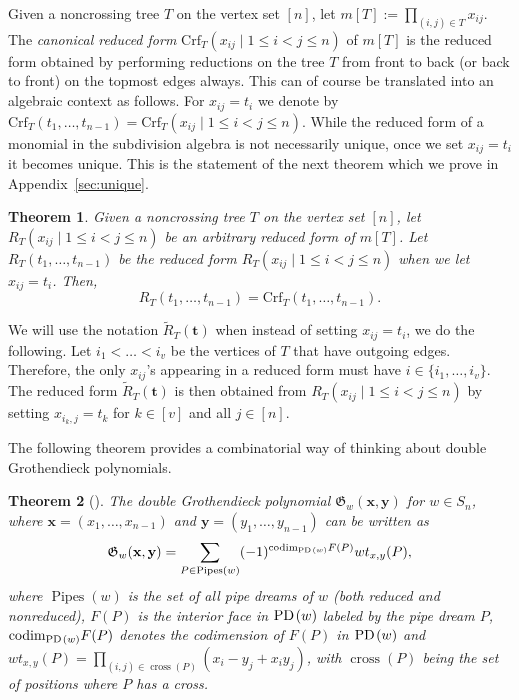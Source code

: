 \documentclass[10pt]{amsart}
\newtheorem{theo}{Theorem}[section]
\theoremstyle{definition}
\numberwithin{equation}{section}
\DeclareMathOperator{\Pipes}{Pipes}
\DeclareMathOperator{\cross}{cross}
\newcommand*{\Crf}{\mathrm{Crf}}
\newcommand*\+{\smash{\lower2pt\hbox{\rlap{\vrule height14pt}}\raise2pt\hbox{\rlap{\hskip-3pt \vrule height.4pt depth0pt width14.7pt}}}}
\newcommand*{\MK}{\mkern 2mu}
\DeclareMathOperator{\PD}{\textit{PD}\MK}
\begin{document}
Given a noncrossing tree $T$ on the vertex set $[n]$, let $m[T]:=\prod_{(i,j)\in T} x_{ij}$. The \emph{canonical reduced form} $\Crf_T(x_{ij} \mid 1\leq i<j\leq n)$ of $m[T]$ is the reduced form obtained by performing reductions on the tree $T$ from front to back (or back to front) on the topmost edges always. This can of course be translated into an algebraic context as follows. For $x_{ij}=t_i$ we denote by $\Crf_T(t_{1}, \dots, t_{n-1})=\Crf_T(x_{ij} \mid 1\leq i<j\leq n)$. While the reduced form of a monomial in the subdivision algebra is not necessarily unique, once we set $x_{ij}=t_i$ it becomes unique. This is the statement of the next theorem which we prove in Appendix~\ref{sec:unique}.

\begin{theo}\label{thm:unique}
Given a noncrossing tree $T$ on the vertex set $[n]$, let $R_T(x_{ij} \mid 1\leq i<j\leq n)$ be an arbitrary reduced form of $m[T]$. Let $R_T(t_{1}, \dots, t_{n-1})$ be the reduced form $R_T(x_{ij} \mid 1\leq i<j\leq n)$ when we let $x_{ij}=t_i$. Then,
\begin{equation}
R_T(t_{1}, \dots, t_{n-1})=\Crf_T(t_{1}, \dots, t_{n-1}).
\end{equation}
\end{theo}

We will use the notation $\tilde{R}_T(\mathbf{t})$ when instead of setting $x_{ij}=t_i$, we do the following. Let $i_1< \dots< i_v$ be the vertices of $T$ that have outgoing edges. Therefore, the only $x_{ij}$'s appearing in a reduced form must have $i \in \{i_1, \dots, i_v\}$. The reduced form $\tilde{R}_T(\mathbf{t})$ is then obtained from $R_T(x_{ij} \mid 1\leq i<j\leq n)$ by setting $x_{i_k, j}=t_k$ for $k \in [v]$ and all $j\in [n]$.


The following theorem provides a combinatorial way of thinking about double Grothendieck polynomials.

\begin{theo}[\cite{fom-kir,subword}]\label{allen}
The \emph{double Grothendieck polynomial $\mathfrak{G}_w(\mathbf{x, y})$} for $w \in S_n$, where $\mathbf{x}=(x_1, \dots, x_{n-1})$ and $\mathbf{y}=(y_1, \dots, y_{n-1})$ can be written as
\begin{equation}
\mathfrak{G}_w(\mathbf{x, y})=\sum_{P\in \Pipes(w)}(-1)^{\mathrm{codim}_{\PD(w)}F(P)} wt_{x,y}(P),\label{eq:groth}
\end{equation}
where $\Pipes(w)$ is the set of all pipe dreams of $w$ (both reduced and nonreduced), $F(P)$ is the interior face in $\PD(w)$ labeled by the pipe dream $P$, $\mathrm{codim}_{\PD(w)} F(P)$ denotes the codimension of $F(P)$ in $\PD(w)$ and $wt_{x,y}(P)=\prod_{(i,j) \in \cross(P)} (x_i-y_j+x_iy_j)$, with $\cross(P)$ being the set of positions where $P$ has a cross. 
\end{theo}
\end{document}
